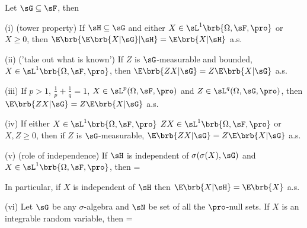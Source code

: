 \begin{proposition}\label{pro:conditional_expectation_tower_independence}
Let $\sG \subseteq \sF$, then
\ben
\item [(i)] (tower property) If $\sH\subseteq \sG$ and either $X\in \sL^1\brb{\Omega,\sF,\pro}$ or $X\geq 0$, then $\E\brb{\E\brb{X|\sG}|\sH} = \E\brb{X|\sH}$ a.s.
\item [(ii)] ('take out what is known') If $Z$ is $\sG$-measurable and bounded, $X\in \sL^1\brb{\Omega,\sF,\pro}$, then $\E\brb{ZX|\sG} = Z\E\brb{X|\sG}$ a.s.
\item [(iii)] If $p>1$, $\frac 1p + \frac 1q =1$, $X\in \sL^p(\Omega,\sF,\pro)$ and $Z\in \sL^q(\Omega,\sG,\pro)$, then $\E\brb{ZX|\sG} = Z\E\brb{X|\sG}$ a.s.
\item [(iv)] If either $X\in \sL^1\brb{\Omega,\sF,\pro}$ $ZX\in \sL^1\brb{\Omega,\sF,\pro}$ or $X,Z\geq 0$, then if $Z$ is $\sG$-measurable, $\E\brb{ZX|\sG} = Z\E\brb{X|\sG}$ a.s.
\item [(v)] (role of independence) If $\sH$ is independent of $\sigma(\sigma(X),\sG)$ and $X\in \sL^1\brb{\Omega,\sF,\pro}$, then
\be
\E{} = \E{} \ 
\ee

In particular, if $X$ is independent of $\sH$ then $\E\brb{X | \sH} = \E\brb{X}$ a.s.
\item [(vi)] Let $\sG$ be any $\sigma$-algebra and $\sN$ be set of all the $\pro$-null sets. If $X$ is an integrable random variable, then
\be
\E{} = \E{}\ 
\ee
\een
\end{proposition}

